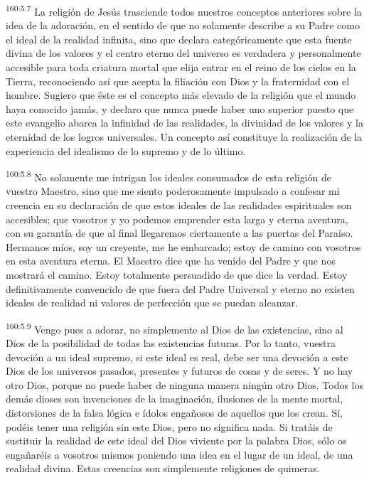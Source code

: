 \par 
\textsuperscript{160:5.7} La religión de Jesús trasciende todos nuestros conceptos anteriores sobre la idea de la adoración, en el sentido de que no solamente describe a su Padre como el ideal de la realidad infinita, sino que declara categóricamente que esta fuente divina de los valores y el centro eterno del universo es verdadera y personalmente accesible para toda criatura mortal que elija entrar en el reino de los cielos en la Tierra, reconociendo así que acepta la filiación con Dios y la fraternidad con el hombre. Sugiero que éste es el concepto más elevado de la religión que el mundo haya conocido jamás, y declaro que nunca puede haber uno superior puesto que este evangelio abarca la infinidad de las realidades, la divinidad de los valores y la eternidad de los logros universales. Un concepto así constituye la realización de la experiencia del idealismo de lo supremo y de lo último.

\par 
\textsuperscript{160:5.8} No solamente me intrigan los ideales consumados de esta religión de vuestro Maestro, sino que me siento poderosamente impulsado a confesar mi creencia en su declaración de que estos ideales de las realidades espirituales son accesibles; que vosotros y yo podemos emprender esta larga y eterna aventura, con su garantía de que al final llegaremos ciertamente a las puertas del Paraíso. Hermanos míos, soy un creyente, me he embarcado; estoy de camino con vosotros en esta aventura eterna. El Maestro dice que ha venido del Padre y que nos mostrará el camino. Estoy totalmente persuadido de que dice la verdad. Estoy definitivamente convencido de que fuera del Padre Universal y eterno no existen ideales de realidad ni valores de perfección que se puedan alcanzar.

\par 
\textsuperscript{160:5.9} Vengo pues a adorar, no simplemente al Dios de las existencias, sino al Dios de la posibilidad de todas las existencias futuras. Por lo tanto, vuestra devoción a un ideal supremo, si este ideal es real, debe ser una devoción a este Dios de los universos pasados, presentes y futuros de cosas y de seres. Y no hay otro Dios, porque no puede haber de ninguna manera ningún otro Dios. Todos los demás dioses son invenciones de la imaginación, ilusiones de la mente mortal, distorsiones de la falsa lógica e ídolos engañosos de aquellos que los crean. Sí, podéis tener una religión sin este Dios, pero no significa nada. Si tratáis de sustituir la realidad de este ideal del Dios viviente por la palabra Dios, sólo os engañaréis a vosotros mismos poniendo una idea en el lugar de un ideal, de una realidad divina. Estas creencias son simplemente religiones de quimeras.

